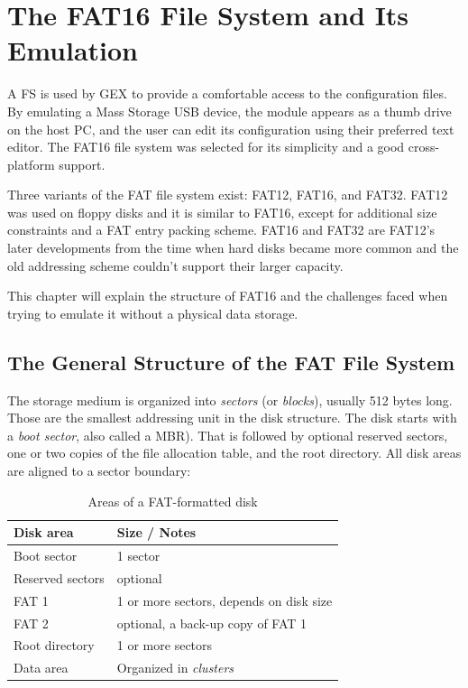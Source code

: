 \chapter{The FAT16 File System and Its Emulation} \label{sec:fat16}

A \gls{FS} is used by GEX to provide a comfortable access to the configuration files. By emulating a Mass Storage \gls{USB} device, the module appears as a thumb drive on the host \gls{PC}, and the user can edit its configuration using their preferred text editor. The FAT16 file system was selected for its simplicity and a good cross-platform support.

Three variants of the \gls{FAT} file system exist: FAT12, FAT16, and FAT32. FAT12 was used on floppy disks and it is similar to FAT16, except for additional size constraints and a \gls{FAT} entry packing scheme. FAT16 and FAT32 are FAT12's later developments from the time when hard disks became more common and the old addressing scheme couldn't support their larger capacity.

This chapter will explain the structure of FAT16 and the challenges faced when trying to emulate it without a physical data storage.

\section{The General Structure of the FAT File System}

The storage medium is organized into \textit{sectors} (or \textit{blocks}), usually 512 bytes long. Those are the smallest addressing unit in the disk structure. The disk starts with a \textit{boot sector}, also called a \gls{MBR}). That is followed by optional reserved sectors, one or two copies of the file allocation table, and the root directory. All disk areas are aligned to a sector boundary:

\begin{table}[h]
	\centering
	\begin{tabular}{ll}
		\toprule
		\textbf{Disk area} & \textbf{Size / Notes} \\
		\midrule
		Boot sector & 1 sector \\
		Reserved sectors & optional \\ 
		FAT 1 & 1 or more sectors, depends on disk size \\ 
		FAT 2 & optional, a back-up copy of FAT 1 \\ 
		Root directory & 1 or more sectors \\ 
		Data area & Organized in \textit{clusters} \\ 
		\bottomrule
	\end{tabular}
	\caption{\label{tab:fat16-disk-areas}Areas of a FAT-formatted disk}
\end{table}

